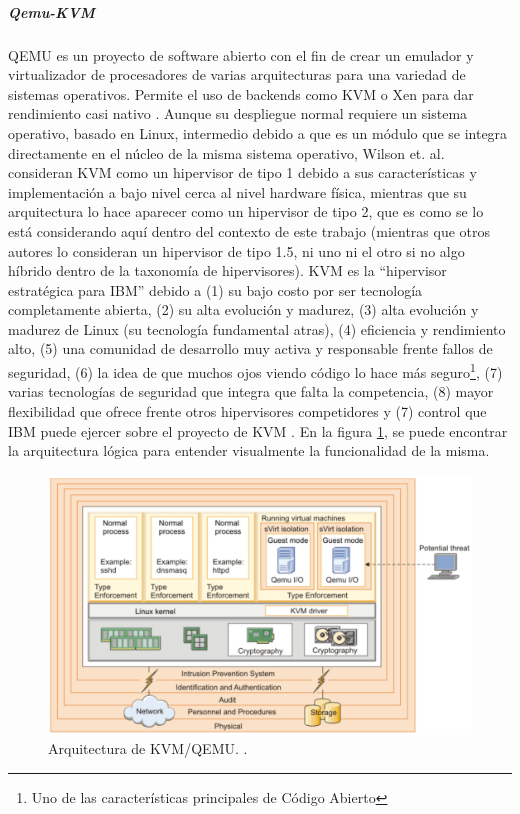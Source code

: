 \subparagraph{Qemu-KVM}
QEMU es un proyecto de software abierto con el fin de crear un emulador y virtualizador de procesadores de varias arquitecturas para una variedad de sistemas operativos. Permite el uso de backends como KVM o Xen para dar rendimiento casi nativo \citep{QEMU}. Aunque su despliegue normal requiere un sistema operativo, basado en Linux, intermedio debido a que es un módulo que se integra directamente en el núcleo de la misma sistema operativo, Wilson et. al. consideran KVM como un hipervisor de tipo 1 debido a sus características y implementación a bajo nivel cerca al nivel hardware física, mientras que su arquitectura lo hace aparecer como un hipervisor de tipo 2, que es como se lo está considerando aquí dentro del contexto de este trabajo (mientras que otros autores lo consideran un hipervisor de tipo 1.5, ni uno ni el otro si no algo híbrido dentro de la taxonomía de hipervisores). KVM es la “hipervisor estratégica para IBM” debido a (1) su bajo costo por ser tecnología completamente abierta, (2) su alta evolución y madurez, (3) alta evolución y madurez de Linux (su tecnología fundamental atras), (4) eficiencia y rendimiento alto, (5) una comunidad de desarrollo muy activa y responsable frente fallos de seguridad, (6) la idea de que muchos ojos viendo código lo hace más seguro\footnote{Uno de las características principales de Código Abierto}, (7) varias tecnologías de seguridad que integra que falta la competencia, (8) mayor flexibilidad que ofrece frente otros hipervisores competidores y (7) control que IBM puede ejercer sobre el proyecto de KVM \citep{IBM-KVM-Security}. En la figura \ref{KVM-Arq}, se puede encontrar la arquitectura lógica para entender visualmente la funcionalidad de la misma.

\begin{figure}
  \begin{center}
      \includegraphics[width=\textwidth]{Figures/kvm-arq.png}
  \end{center}
  \caption{Arquitectura de KVM/QEMU. \citep{IBM-KVM-Security}.}
  \label{KVM-Arq}
\end{figure}

